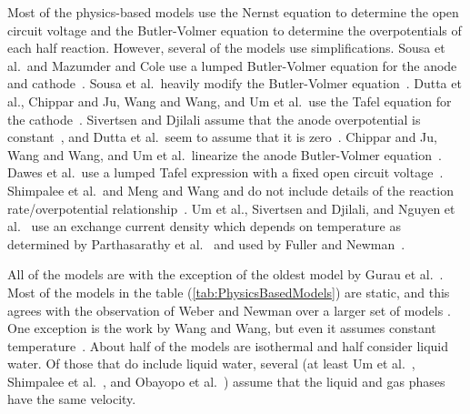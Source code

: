 Most of the physics-based models use the Nernst equation to determine the open circuit voltage and the Butler-Volmer equation to determine the overpotentials of each half reaction.  However, several of the models use simplifications.  Sousa et al.\ and Mazumder and Cole use a lumped Butler-Volmer equation for the anode and cathode~\cite{Mazumder2003a, Mazumder2003b}.  Sousa et al.\ heavily modify the Butler-Volmer equation~\cite{Sousa2012}.  Dutta et al., Chippar and Ju, Wang and Wang, and Um et al.\ use the Tafel equation for the cathode~\cite{Dutta2000, Chippar2012, Wang2006, Um2000, Um2004}.  Sivertsen and Djilali assume that the anode overpotential is constant~\cite{Sivertsen2005}, and Dutta et al.\ seem to assume that it is zero~\cite{Dutta2000}.  Chippar and Ju, Wang and Wang, and Um et al.\ linearize the anode Butler-Volmer equation~\cite{Chippar2012, Wang2006, Um2000, Um2004}.  Dawes et al.\ use a lumped Tafel expression with a fixed open circuit voltage~\cite{Dawes2009}.  Shimpalee et al.\ and Meng and Wang and do not include details of the reaction rate\slash{}overpotential relationship~\cite{Shimpalee2009, Meng2004, Meng2005}.  Um et al., Sivertsen and Djilali, and Nguyen et al.~\cite{Um2000, Um2004, Sivertsen2005, Nguyen2004} use an exchange current density which depends on temperature as determined by Parthasarathy et al.~\cite{Parthasarathy1992} and used by Fuller and Newman~\cite{Fuller1993}.

All of the models are  with the exception of the oldest model by Gurau et al.~\cite{Gurau1998}.  Most of the models in the table (\ref{tab:PhysicsBasedModels}) are static, and this agrees with the observation of Weber and Newman over a larger set of models \cite[p.~4719]{Weber2004ChemRev}.  One exception is the work by Wang and Wang, but even it assumes constant temperature~\cite{Um2000, Wang2006}.  About half of the models are isothermal and half consider liquid water.  Of those that do include liquid water, several (at least Um et al.~\cite{Um2004}, Shimpalee et al.~\cite{Shimpalee2009}, and Obayopo et al.~\cite{Obayopo2013}) assume that the liquid and gas phases have the same velocity.


